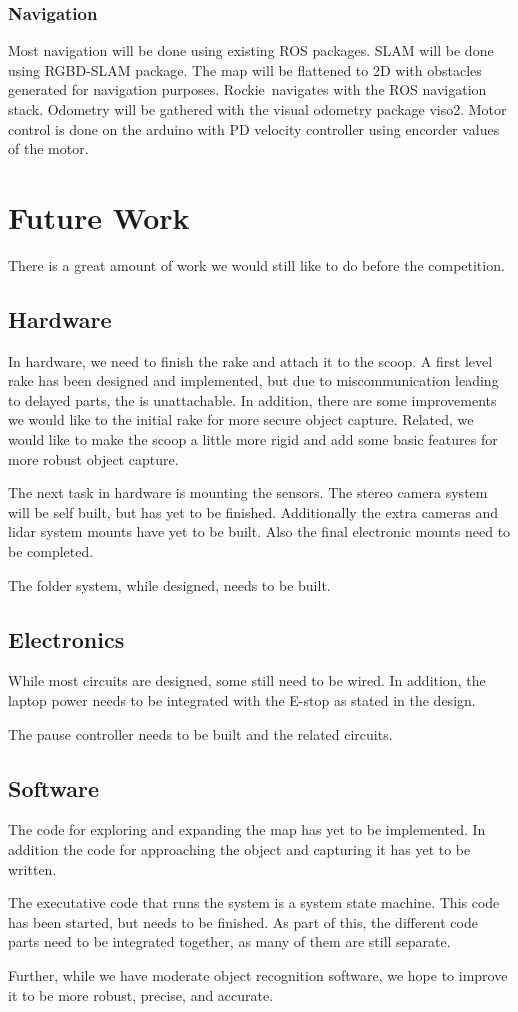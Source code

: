 \documentclass{paper}
\newcommand \robotName{Rockie} 		%
\begin{document}
\subsubsection*{Navigation}
Most navigation will be done using existing ROS packages.  SLAM will be done using RGBD-SLAM package.  The map will be flattened to 2D with obstacles generated for navigation purposes.  \robotName \ navigates with the ROS navigation stack.  Odometry will be gathered with the visual odometry package viso2.  Motor control is done on the arduino with PD velocity controller using encorder values of the motor.

\section*{Future Work}
There is a great amount of work we would still like to do before the competition.

\subsection*{Hardware}
In hardware, we need to finish the rake and attach it to the scoop.  A first level rake has been designed and implemented, but due to miscommunication leading to delayed parts, the is unattachable.  In addition, there are some improvements we would like to the initial rake for more secure object capture.  Related, we would like to make the scoop a little more rigid and add some basic features for more robust object capture.

The next task in hardware is mounting the sensors.  The stereo camera system will be self built, but has yet to be finished.  Additionally the extra cameras and lidar system mounts have yet to be built.  Also the final electronic mounts need to be completed.

The folder system, while designed, needs to be built.

\subsection*{Electronics}
While most circuits are designed, some still need to be wired.  In addition, the laptop power needs to be integrated with the E-stop as stated in the design.

The pause controller needs to be built and the related circuits.

\subsection*{Software}
The code for exploring and expanding the map has yet to be implemented.  In addition the code for approaching the object and capturing it has yet to be written.

The executative code that runs the system is a system state machine.  This code has been started, but needs to be finished.  As part of this, the different code parts need to be integrated together, as many of them are still separate.

Further, while we have moderate object recognition software, we hope to improve it to be more robust, precise, and accurate.
\end{document}
